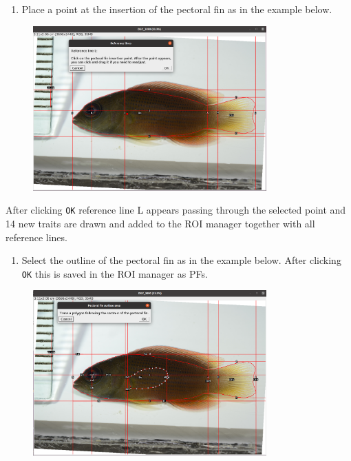 \documentclass[
  letterpaper,
  DIV=11,
  numbers=noendperiod,
  oneside]{scrreprt}
\providecommand{\tightlist}{%
  \setlength{\itemsep}{0pt}\setlength{\parskip}{0pt}}\usepackage{longtable,booktabs,array}
\begin{document}
\begin{enumerate}
\def\labelenumi{\arabic{enumi}.}
\setcounter{enumi}{8}
\tightlist
\item
  Place a point at the insertion of the pectoral fin as in the example
  below.
\end{enumerate}

\begin{figure}

{\centering \includegraphics[width=0.8\textwidth,height=\textheight]{./images/screenshots/pectoral_fin_insertion.png}

}

\end{figure}

After clicking \texttt{OK} reference line L appears passing through the
selected point and 14 new traits are drawn and added to the ROI manager
together with all reference lines.

\begin{enumerate}
\def\labelenumi{\arabic{enumi}.}
\setcounter{enumi}{9}
\tightlist
\item
  Select the outline of the pectoral fin as in the example below. After
  clicking \texttt{OK} this is saved in the ROI manager as PFs.
\end{enumerate}

\begin{figure}

{\centering \includegraphics[width=0.8\textwidth,height=\textheight]{./images/screenshots/pectoral_fin_outline.png}

}

\end{figure}
\end{document}
